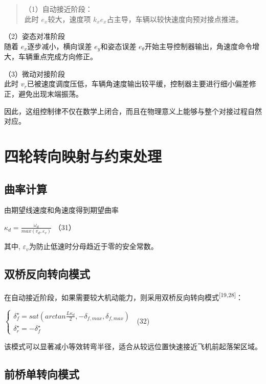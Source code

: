\begin{quote}
（1）自动接近阶段：\\
此时 \(e_{x}\)较大，速度项
\(k_{x}e_{x}\)占主导，车辆以较快速度向预对接点推进。
\end{quote}

（2）姿态对准阶段\\
随着 \(e_{x}\)逐步减小，横向误差 \(e_{y}\)和姿态误差
\(e_{\theta}\)开始主导控制器输出，角速度命令增大，车辆重点完成方向修正。

（3）微动对接阶段\\
此时
\(v_{r}\)已被速度调度压低，车辆角速度输出较平缓，控制器主要进行细小偏差修正，避免出现末端振荡。

因此，这组控制律不仅在数学上闭合，而且在物理意义上能够与整个对接过程自然对应。

\section{四轮转向映射与约束处理}

\subsection{曲率计算}

由期望线速度和角速度得到期望曲率

\(\kappa_{d} = \frac{\omega_{d}}{max(v_{d},\varepsilon_{v})}\) （31）

其中, \(\varepsilon_{v}\)为防止低速时分母趋近于零的安全常数。

\subsection{双桥反向转向模式}

在自动接近阶段，如果需要较大机动能力，则采用双桥反向转向模式\textsuperscript{[19,28]}：

\(\left\{ \begin{array}{r}
\delta_{f}^{\star} = sat\left( arctan\frac{L\kappa_{d}}{2}, - \delta_{f,max},\delta_{f,max} \right) \\
\delta_{r}^{\star} = - \delta_{f}^{\star}
\end{array} \right.\ \) (32)

该模式可以显著减小等效转弯半径，适合从较远位置快速接近飞机前起落架区域。

\subsection{前桥单转向模式}

